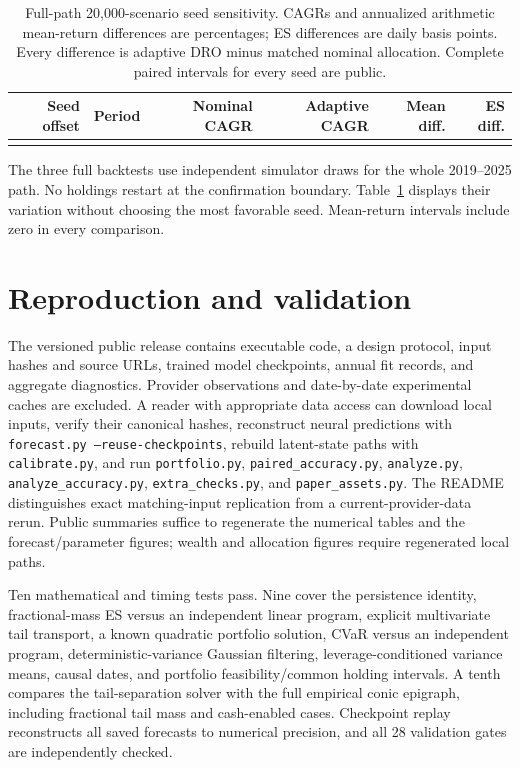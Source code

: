 \begin{table}[t]
\centering\small\setlength{\tabcolsep}{6pt}
\caption{Full-path 20,000-scenario seed sensitivity. CAGRs and annualized arithmetic mean-return differences are percentages; ES differences are daily basis points. Every difference is adaptive DRO minus matched nominal allocation. Complete paired intervals for every seed are public.}
\label{tab:paired_seeds}
\begin{tabular}{rlrrrr}\toprule
Seed offset&Period&Nominal CAGR&Adaptive CAGR&Mean diff.&ES diff.\\\midrule
\\\bottomrule
\end{tabular}
\end{table}
The three full backtests use independent simulator draws for the whole 2019--2025 path. No holdings restart at the confirmation boundary. Table~\ref{tab:paired_seeds} displays their variation without choosing the most favorable seed. Mean-return intervals include zero in every comparison.

\section{Reproduction and validation}
\label{app:reproduction}
The versioned public release contains executable code, a design protocol, input hashes and source URLs, trained model checkpoints, annual fit records, and aggregate diagnostics. Provider observations and date-by-date experimental caches are excluded. A reader with appropriate data access can download local inputs, verify their canonical hashes, reconstruct neural predictions with \texttt{forecast.py --reuse-checkpoints}, rebuild latent-state paths with \texttt{calibrate.py}, and run \texttt{portfolio.py}, \texttt{paired\_accuracy.py}, \texttt{analyze.py}, \texttt{analyze\_accuracy.py}, \texttt{extra\_checks.py}, and \texttt{paper\_assets.py}. The README distinguishes exact matching-input replication from a current-provider-data rerun. Public summaries suffice to regenerate the numerical tables and the forecast/parameter figures; wealth and allocation figures require regenerated local paths.

Ten mathematical and timing tests pass. Nine cover the persistence identity, fractional-mass ES versus an independent linear program, explicit multivariate tail transport, a known quadratic portfolio solution, CVaR versus an independent program, deterministic-variance Gaussian filtering, leverage-conditioned variance means, causal dates, and portfolio feasibility/common holding intervals. A tenth compares the tail-separation solver with the full empirical conic epigraph, including fractional tail mass and cash-enabled cases. Checkpoint replay reconstructs all saved forecasts to numerical precision, and all 28 validation gates are independently checked.

